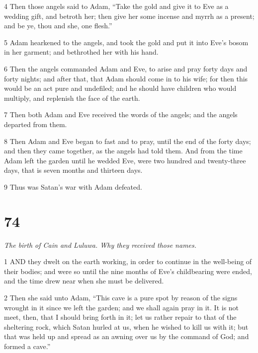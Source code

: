 \par 4 Then those angels said to Adam, “Take the gold and give it to Eve as a wedding gift, and betroth her; then give her some incense and myrrh as a present; and be ye, thou and she, one flesh.”

\par 5 Adam hearkened to the angels, and took the gold and put it into Eve's bosom in her garment; and bethrothed her with his hand.

\par 6 Then the angels commanded Adam and Eve, to arise and pray forty days and forty nights; and after that, that Adam should come in to his wife; for then this would be an act pure and undefiled; and he should have children who would multiply, and replenish the face of the earth.

\par 7 Then both Adam and Eve received the words of the angels; and the angels departed from them.

\par 8 Then Adam and Eve began to fast and to pray, until the end of the forty days; and then they came together, as the angels had told them. And from the time Adam left the garden until he wedded Eve, were two hundred and twenty-three days, that is seven months and thirteen days.

\par 9 Thus was Satan's war with Adam defeated.



\chapter{74}

\par \textit{The birth of Cain and Luluwa. Why they received those names.}

\par 1 AND they dwelt on the earth working, in order to continue in the well-being of their bodies; and were so until the nine months of Eve's childbearing were ended, and the time drew near when she must be delivered.

\par 2 Then she said unto Adam, “This cave is a pure spot by reason of the signs wrought in it since we left the garden; and we shall again pray in it. It is not meet, then, that I should bring forth in it; let us rather repair to that of the sheltering rock, which Satan hurled at us, when he wished to kill us with it; but that was held up and spread as an awning over us by the command of God; and formed a cave.”

